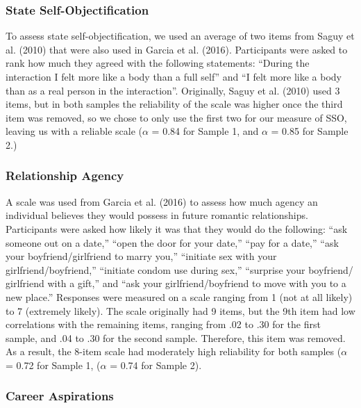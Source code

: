 \documentclass[man]{apa6}
\begin{document}
\subsubsection{State
Self-Objectification}\label{state-self-objectification}

To assess state self-objectification, we used an average of two items
from Saguy et al. (2010) that were also used in Garcia et al. (2016).
Participants were asked to rank how much they agreed with the following
statements: \enquote{During the interaction I felt more like a body than
a full self} and \enquote{I felt more like a body than as a real person
in the interaction}. Originally, Saguy et al. (2010) used 3 items, but
in both samples the reliability of the scale was higher once the third
item was removed, so we chose to only use the first two for our measure
of SSO, leaving us with a reliable scale (\(\alpha\) = 0.84 for Sample
1, and \(\alpha\) = 0.85 for Sample 2.)

\subsubsection{Relationship Agency}\label{relationship-agency}

A scale was used from Garcia et al. (2016) to assess how much agency an
individual believes they would possess in future romantic relationships.
Participants were asked how likely it was that they would do the
following: \enquote{ask someone out on a date,} \enquote{open the door
for your date,} \enquote{pay for a date,} \enquote{ask your
boyfriend/girlfriend to marry you,} \enquote{initiate sex with your
girlfriend/boyfriend,} \enquote{initiate condom use during sex,}
\enquote{surprise your boyfriend/ girlfriend with a gift,} and
\enquote{ask your girlfriend/boyfriend to move with you to a new place.}
Responses were measured on a scale ranging from 1 (not at all likely) to
7 (extremely likely). The scale originally had 9 items, but the 9th item
had low correlations with the remaining items, ranging from .02 to .30
for the first sample, and .04 to .30 for the second sample. Therefore,
this item was removed. As a result, the 8-item scale had moderately high
reliability for both samples (\(\alpha\) = 0.72 for Sample 1,
(\(\alpha\) = 0.74 for Sample 2).

\subsubsection{Career Aspirations}\label{career-aspirations}
\end{document}
